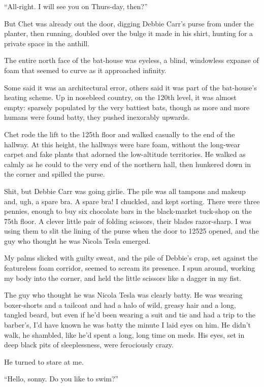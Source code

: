 ``All-right. I will see you on Thurs-day, then?''

But Chet was already out the door, digging Debbie Carr's purse from
under the planter, then running, doubled over the bulge it made in
his shirt, hunting for a private space in the anthill.

\tb

The entire north face of the bat-house was eyeless, a blind,
windowless expanse of foam that seemed to curve as it approached
infinity.

Some said it was an architectural error, others said it was part of
the bat-house's heating scheme. Up in nosebleed country, on the
120th level, it was almost empty: sparsely populated by the very
battiest bats, though as more and more humans were found batty,
they pushed inexorably upwards.

Chet rode the lift to the 125th floor and walked casually to the
end of the hallway. At this height, the hallways were bare foam,
without the long-wear carpet and fake plants that adorned the
low-altitude territories. He walked as calmly as he could to the
very end of the northern hall, then hunkered down in the corner and
spilled the purse.

Shit, but Debbie Carr was going girlie. The pile was all tampons
and makeup and, ugh, a spare bra. A spare bra! I chuckled, and kept
sorting. There were three pennies, enough to buy six chocolate bars
in the black-market tuck-shop on the 75th floor. A clever little
pair of folding scissors, their blades razor-sharp. I was using
them to slit the lining of the purse when the door to 12525 opened,
and the guy who thought he was Nicola Tesla emerged.

My palms slicked with guilty sweat, and the pile of Debbie's crap,
set against the featureless foam corridor, seemed to scream its
presence. I spun around, working my body into the corner, and held
the little scissors like a dagger in my fist.

The guy who thought he was Nicola Tesla was clearly batty. He was
wearing boxer-shorts and a tailcoat and had a halo of wild, greasy
hair and a long, tangled beard, but even if he'd been wearing a
suit and tie and had a trip to the barber's, I'd have known he was
batty the minute I laid eyes on him. He didn't walk, he shambled,
like he'd spent a long, long time on meds. His eyes, set in deep
black pits of sleeplessness, were ferociously crazy.

He turned to stare at me.

``Hello, sonny. Do you like to swim?''

